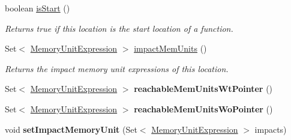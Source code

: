\begin{DoxyCompactItemize}
\item 
boolean \hyperlink{classedu_1_1udel_1_1cis_1_1vsl_1_1civl_1_1model_1_1common_1_1location_1_1CommonLocation_a0151d4b7d479e67a65066060ed0be652}{is\+Start} ()
\begin{DoxyCompactList}\small\item\em Returns true if this location is the start location of a function. \end{DoxyCompactList}\item 
Set$<$ \hyperlink{interfaceedu_1_1udel_1_1cis_1_1vsl_1_1civl_1_1model_1_1IF_1_1expression_1_1MemoryUnitExpression}{Memory\+Unit\+Expression} $>$ \hyperlink{classedu_1_1udel_1_1cis_1_1vsl_1_1civl_1_1model_1_1common_1_1location_1_1CommonLocation_ac145876fa528dec8f4f7206576664118}{impact\+Mem\+Units} ()
\begin{DoxyCompactList}\small\item\em Returns the impact memory unit expressions of this location. \end{DoxyCompactList}\item 
\hypertarget{classedu_1_1udel_1_1cis_1_1vsl_1_1civl_1_1model_1_1common_1_1location_1_1CommonLocation_a34caae5a26a42da334b00282a52b7940}{}Set$<$ \hyperlink{interfaceedu_1_1udel_1_1cis_1_1vsl_1_1civl_1_1model_1_1IF_1_1expression_1_1MemoryUnitExpression}{Memory\+Unit\+Expression} $>$ {\bfseries reachable\+Mem\+Units\+Wt\+Pointer} ()\label{classedu_1_1udel_1_1cis_1_1vsl_1_1civl_1_1model_1_1common_1_1location_1_1CommonLocation_a34caae5a26a42da334b00282a52b7940}

\item 
\hypertarget{classedu_1_1udel_1_1cis_1_1vsl_1_1civl_1_1model_1_1common_1_1location_1_1CommonLocation_ad985bdf66f22444f549e56ef6de23604}{}Set$<$ \hyperlink{interfaceedu_1_1udel_1_1cis_1_1vsl_1_1civl_1_1model_1_1IF_1_1expression_1_1MemoryUnitExpression}{Memory\+Unit\+Expression} $>$ {\bfseries reachable\+Mem\+Units\+Wo\+Pointer} ()\label{classedu_1_1udel_1_1cis_1_1vsl_1_1civl_1_1model_1_1common_1_1location_1_1CommonLocation_ad985bdf66f22444f549e56ef6de23604}

\item 
\hypertarget{classedu_1_1udel_1_1cis_1_1vsl_1_1civl_1_1model_1_1common_1_1location_1_1CommonLocation_aa1c56122b319af33803782e30fbb7c15}{}void {\bfseries set\+Impact\+Memory\+Unit} (Set$<$ \hyperlink{interfaceedu_1_1udel_1_1cis_1_1vsl_1_1civl_1_1model_1_1IF_1_1expression_1_1MemoryUnitExpression}{Memory\+Unit\+Expression} $>$ impacts)\label{classedu_1_1udel_1_1cis_1_1vsl_1_1civl_1_1model_1_1common_1_1location_1_1CommonLocation_aa1c56122b319af33803782e30fbb7c15}


\end{DoxyCompactItemize}
